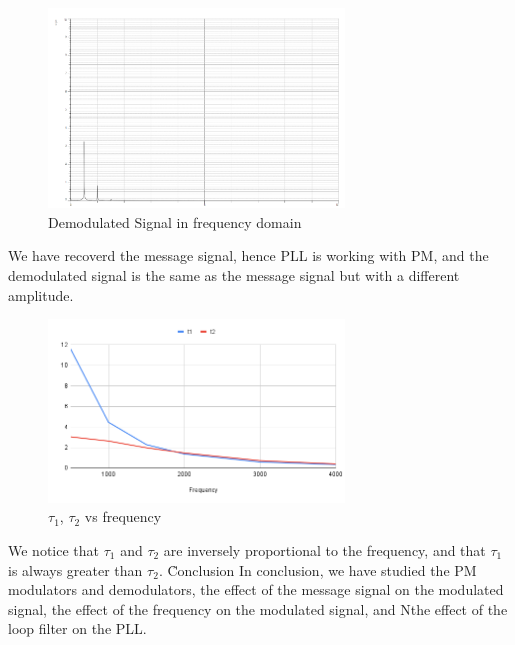 \documentclass[12pt]{article}
\begin{document}
\begin{figure}[H]
    \centering
    \includegraphics[width=0.7\textwidth]{assets/p6.png}
    \caption{Demodulated Signal in frequency domain}
\end{figure}
We have recoverd the message signal, hence PLL is working with PM, and the demodulated signal is the same as the message signal but with a different amplitude.
\begin{table}[H]
    \caption{$\tau_1$, $\tau_2$ vs frequency}
    \label{tab:my-table}
    \end{table}

\begin{figure}[H]
    \centering
    \includegraphics[width=0.7\textwidth]{assets/chart (16).png}
    \caption{$\tau_1$, $\tau_2$ vs frequency}
\end{figure}
We notice that $\tau_1$ and $\tau_2$ are inversely proportional to the frequency, and that $\tau_1$ is always greater than $\tau_2$.
\clearpage
\h{Conclusion}
In conclusion, we have studied the PM modulators and demodulators, the effect of the message signal on the modulated signal, the effect of the frequency on the modulated signal, and Nthe effect of the loop filter on the PLL.
\clearpage


\end{document}
